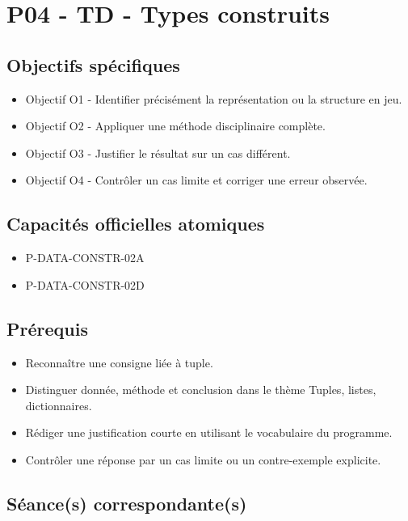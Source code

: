 \section{P04 - TD - Types construits}

\subsection{Objectifs spécifiques}

\begin{itemize}
\tightlist
\item
  Objectif O1 - Identifier précisément la représentation ou la structure
  en jeu.
\item
  Objectif O2 - Appliquer une méthode disciplinaire complète.
\item
  Objectif O3 - Justifier le résultat sur un cas différent.
\item
  Objectif O4 - Contrôler un cas limite et corriger une erreur observée.
\end{itemize}

\subsection{Capacités officielles atomiques}

\begin{itemize}
\tightlist
\item
  P-DATA-CONSTR-02A
\item
  P-DATA-CONSTR-02D
\end{itemize}

\subsection{Prérequis}

\begin{itemize}
\tightlist
\item
  Reconnaître une consigne liée à tuple.
\item
  Distinguer donnée, méthode et conclusion dans le thème Tuples, listes,
  dictionnaires.
\item
  Rédiger une justification courte en utilisant le vocabulaire du
  programme.
\item
  Contrôler une réponse par un cas limite ou un contre-exemple
  explicite.
\end{itemize}

\subsection{Séance(s) correspondante(s)}

